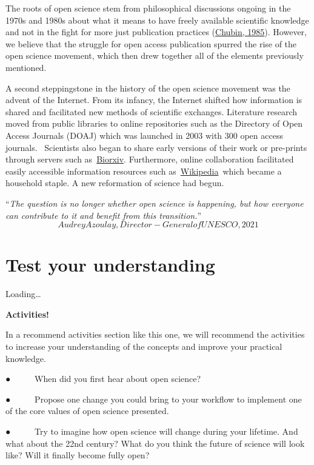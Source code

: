 \documentclass[
]{book}
\begin{document}
The roots of open science stem from philosophical discussions ongoing in the 1970s and 1980s about what it means to have freely available scientific knowledge and not in the fight for more just publication practices (\href{https://journals.sagepub.com/doi/10.1177/016224398501000211}{Chubin, 1985}). However, we believe that the struggle for open access publication spurred the rise of the open science movement, which then drew together all of the elements previously mentioned.

A second steppingstone in the history of the open science movement was the advent of the Internet. From its infancy, the Internet shifted how information is shared and facilitated new methods of scientific exchanges. Literature research moved from public libraries to online repositories such as the Directory of Open Access Journals (DOAJ) which was launched in 2003 with 300 open access journals. ~Scientists also began to share early versions of their work or pre-prints through servers such as~\href{https://www.biorxiv.org/}{}\href{https://www.biorxiv.org/}{Biorxiv}. Furthermore, online collaboration facilitated easily accessible information resources such as~\href{https://en.wikipedia.org/}{}\href{https://en.wikipedia.org/}{Wikipedia}~which became a household staple. A new reformation of science had begun.

``\emph{The question is no longer whether open science is happening, but how everyone can contribute to it and benefit from this transition.}'' \[Audrey Azoulay, Director-General of UNESCO, 2021\]

\hypertarget{test-your-understanding}{%
\section{Test your understanding}\label{test-your-understanding}}

Loading\ldots{}

\textbf{Activities!}

In a recommend activities section like this one, we will recommend the activities to increase your understanding of the concepts and improve your practical knowledge.

● ~ ~ ~ When did you first hear about open science?

● ~ ~ ~ Propose one change you could bring to your workflow to implement one of the core values of open science presented.

● ~ ~ ~ Try to imagine how open science will change during your lifetime. And what about the 22nd century? What do you think the future of science will look like? Will it finally become fully open?
\end{document}
